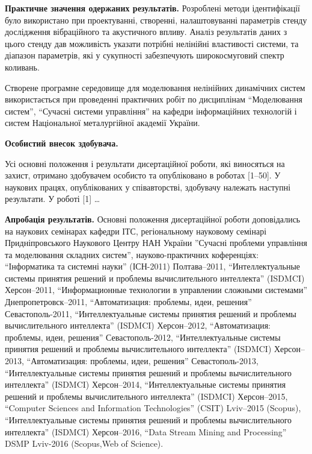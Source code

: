 \documentclass[a4paper,12pt]{atuaref}
\begin{document}
\smallskip
\textbf{Практичне значення одержаних результатів.}
Розроблені методи ідентифікації було використано
при проектуванні, створенні, налаштовуванні параметрів
стенду дослідження вібраційного та акустичного впливу.
Аналіз результатів даних з цього стенду
дав можливість указати потрібні нелінійні властивості системи,
та діапазон параметрів, які у сукупності
забезпечують широкосмуговий спектр коливань.

Створене програмне середовище для моделювання нелінійних динамічних систем
використається при проведенні практичних робіт по дисциплінам
``Моделювання систем'',
``Сучасні системи управління'' на кафедри інформаційних технологій
і систем Національної металургійної академії України.


\smallskip
\textbf{Особистий внесок здобувача.}

Усі основні положення і результати
дисертаційної роботи, які виносяться на захист, отримано здобувачем особисто та
опубліковано в роботах [1--50]. У наукових працях, опублікованих у співавторстві,
здобувачу належать наступні результати. У роботі [1] \ldots



\smallskip
\textbf{Апробація результатів.}
Основні положення дисертаційної роботи доповідались на наукових
семінарах кафедри ІТС,
регіональному науковому семінарі Придніпровського Наукового Центру НАН України
''Сучасні проблеми управління та моделювання складних систем'',
науково-практичних коференціях:
``Інформатика та системні науки'' (ІСН-2011) Полтава--2011,
``Интеллектуальные системы принятия решений и проблемы вычислительного интеллекта'' (ISDMCI) Херсон--2011,
``Информационные технологии в управлении сложными системами'' Днепропетровск--2011,
``Автоматизация: проблемы, идеи, решения'' Севастополь-2011,
``Интеллектуальные системы принятия решений и проблемы вычислительного интеллекта'' (ISDMCI) Херсон--2012,
``Автоматизация: проблемы, идеи, решения'' Севастополь-2012,
``Интеллектуальные системы принятия решений и проблемы вычислительного интеллекта'' (ISDMCI) Херсон--2013,
``Автоматизация: проблемы, идеи, решения'' Севастополь-2013,
``Интеллектуальные системы принятия решений и проблемы вычислительного интеллекта'' (ISDMCI) Херсон--2014,
``Интеллектуальные системы принятия решений и проблемы вычислительного интеллекта'' (ISDMCI) Херсон--2015,
``Computer Sciences and Information Technologies'' (CSIT) Lviv--2015 (Scopus),
``Интеллектуальные системы принятия решений и проблемы вычислительного интеллекта'' (ISDMCI) Херсон--2016,
``Data Stream Mining and Processing'' DSMP Lviv-2016 (Scopus,Web of Science).
\end{document}
